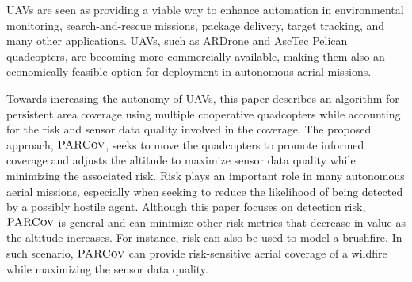 \documentclass[letterpaper, 10pt, conference]{ieeeconf}
\newcommand{\Function}[1]{\ensuremath{{ \textsc{#1}}}}
\newcommand{\Name}{\Function{\small{PARCov}}}
\begin{document}


UAVs are seen as providing a viable way to enhance automation in
environmental monitoring, search-and-rescue missions, package
delivery, target tracking, and many other applications.  UAVs, such as
ARDrone and AscTec Pelican quadcopters, are becoming more commercially
available, making them also an economically-feasible option for
deployment in autonomous aerial missions.
 
Towards increasing the autonomy of UAVs, this paper describes an
algorithm for persistent area coverage using multiple cooperative
quadcopters while accounting for the risk and sensor data quality
involved in the coverage. The proposed approach, $\Name$, seeks to
move the quadcopters to promote informed coverage and adjusts the
altitude to maximize sensor data quality while minimizing the
associated risk. Risk plays an important role in many autonomous
aerial missions, especially when seeking to reduce the likelihood of
being detected by a possibly hostile agent. Although this paper
focuses on detection risk, $\Name$ is general and can minimize other
risk metrics that decrease in value as the altitude increases.  For
instance, risk can also be used to model a brushfire. In such
scenario, $\Name$ can provide risk-sensitive aerial
coverage of a wildfire while maximizing the sensor data quality.





\end{document}
